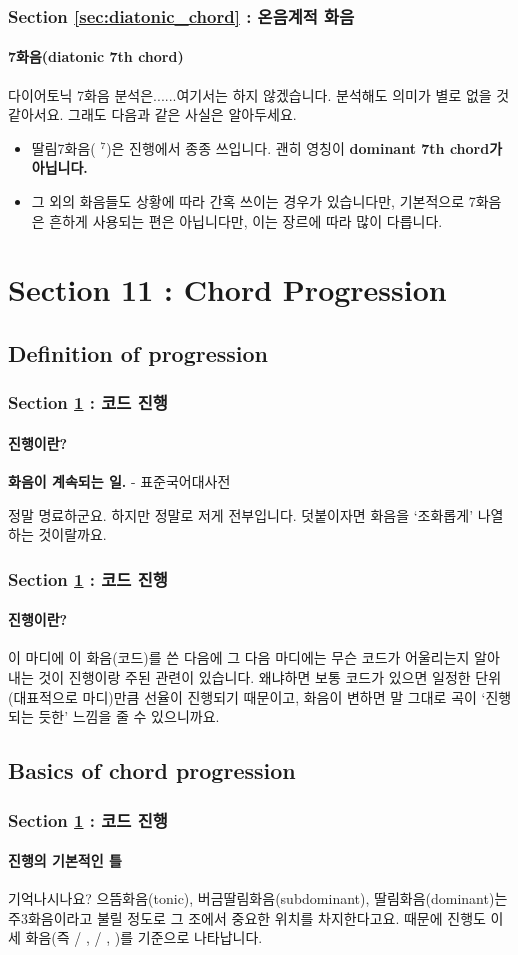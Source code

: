 \documentclass{beamer}
\newcommand{\Rn}[1]{%
	\textup{\uppercase\expandafter{\romannumeral#1}}%
}
\newcommand{\rn}[1]{%
	\textup{\lowercase\expandafter{\romannumeral#1}}%
}
\begin{document}
	\begin{frame}
		\frametitle{Section \ref{sec:diatonic_chord} : 온음계적 화음}
		\framesubtitle{7화음(diatonic 7th chord)}
		다이어토닉 7화음 분석은......여기서는 하지 않겠습니다. 분석해도 의미가 별로 없을 것 같아서요. 그래도 다음과 같은 사실은 알아두세요.
		\begin{itemize}
			\item 딸림7화음(\Rn{5}$^7$)은 진행에서 종종 쓰입니다. 괜히 영칭이 {\bf dominant 7th chord가 아닙니다.}
			\item 그 외의 화음들도 상황에 따라 간혹 쓰이는 경우가 있습니다만, 기본적으로 7화음은 흔하게 사용되는 편은 아닙니다만, 이는 장르에 따라 많이 다릅니다.
		\end{itemize}
	\end{frame}
	
	\section{Section 11 : Chord Progression}\label{sec:progression}
	\subsection{Definition of progression}
	\begin{frame}
		\frametitle{Section \ref{sec:progression} : 코드 진행}
		\framesubtitle{진행이란?}
		\begin{definition}[진행, 進行, Progression]
			{\bf 화음이 계속되는 일.} - 표준국어대사전
		\end{definition}
		정말 명료하군요. 하지만 정말로 저게 전부입니다. 덧붙이자면 화음을 `조화롭게' 나열하는 것이랄까요.
	\end{frame}
	
	\begin{frame}
		\frametitle{Section \ref{sec:progression} : 코드 진행}
		\framesubtitle{진행이란?}
		이 마디에 이 화음(코드)를 쓴 다음에 그 다음 마디에는 무슨 코드가 어울리는지 알아내는 것이 진행이랑 주된 관련이 있습니다. 왜냐하면 보통 코드가 있으면 일정한 단위(대표적으로 마디)만큼 선율이 진행되기 때문이고, 화음이 변하면 말 그대로 곡이 `진행되는 듯한' 느낌을 줄 수 있으니까요.
	\end{frame}
	
	\subsection{Basics of chord progression}
	\begin{frame}
		\frametitle{Section \ref{sec:progression} : 코드 진행}
		\framesubtitle{진행의 기본적인 틀}
		기억나시나요? 으뜸화음(tonic), 버금딸림화음(subdominant), 딸림화음(dominant)는 주3화음이라고 불릴 정도로 그 조에서 중요한 위치를 차지한다고요. 때문에 진행도 이 세 화음(즉 \Rn{1}/\rn{1}, \Rn{4}/\rn{4}, \rn{5})를 기준으로 나타납니다. 
	\end{frame}
	
\end{document}
